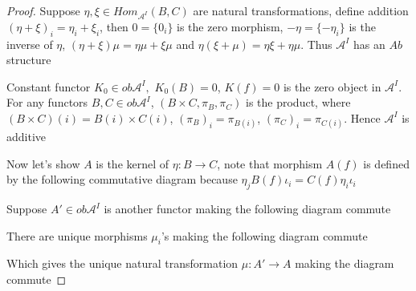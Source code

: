 \documentclass{article}
\theoremstyle{definition}
\theoremstyle{remark}
\theoremstyle{definition}
\begin{document}
\begin{proof}
Suppose $\eta,\xi\in Hom_{\mathcal A^I}(B,C)$ are natural transformations, define addition $(\eta+\xi)_i=\eta_i+\xi_i$, then $0=\{0_i\}$ is the zero morphism, $-\eta=\{-\eta_i\}$ is the inverse of $\eta$, $(\eta+\xi)\mu=\eta\mu+\xi\mu$ and $\eta(\xi+\mu)=\eta\xi+\eta\mu$. Thus $\mathcal A^I$ has an $Ab$ structure \par
Constant functor $K_0\in ob\mathcal A^I, $ $K_0(B)=0$, $K(f)=0$ is the zero object in $\mathcal A^I$. For any functors $B,C\in ob\mathcal A^I$, $(B\times C,\pi_B,\pi_C)$ is the product, where $(B\times C)(i)=B(i)\times C(i)$, $(\pi_B)_i=\pi_{B(i)}$, $(\pi_C)_i=\pi_{C(i)}$. Hence $\mathcal A^I$ is additive \par
Now let's show $A$ is the kernel of $\eta:B\to C$, note that morphism $A(f)$ is defined by the following  commutative diagram because $\eta_jB(f)\iota_i=C(f)\eta_i\iota_i$ \par
\begin{center}
\end{center}
Suppose $A'\in ob\mathcal A^I$ is another functor making the following diagram commute
\begin{center}
\end{center}
There are unique morphisms $\mu_i$'s making the following diagram commute
\begin{center}
\end{center}
Which gives the unique natural transformation $\mu:A'\to A$ making the diagram commute

\end{proof}
\end{document}
